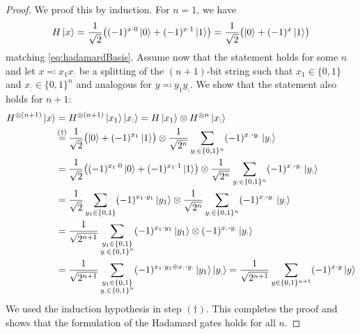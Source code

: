 				\begin{proof}
					We proof this by induction. For \(n = 1\), we have
					\begin{equation}
						H \ket{x}
						= \frac{1}{\sqrt{2}} \bigl( (-1)^{x \cdot 0} \ket{0} + (-1)^{x \cdot 1} \ket{1} \bigr)
						= \frac{1}{\sqrt{2}} \bigl( \ket{0} + (-1)^x \ket{1} \bigr)
					\end{equation}
					matching \eqref{eq:hadamardBasis}. Assume now that the statement holds for some \(n\) and let \( x \eqqcolon x_1 x_: \) be a splitting of the \((n + 1)\)-bit string such that \( x_1 \in \{ 0, 1 \} \) and \( x_: \in \{ 0, 1 \}^n \) and analogous for \( y \eqqcolon y_1 y_: \). We show that the statement also holds for \(n + 1\):
					\begin{align}
						H^{\otimes (n + 1)} \ket{x}
						 & = H^{\otimes (n + 1)} \ket{x_1}\ket{x_:}
						= H \ket{x_1} \otimes H^{\otimes n} \ket{x_:}                                                                                                                                                    \\
						 & \overset{\mathclap{(\dagger)}}{=} \frac{1}{\sqrt{2}} \bigl( \ket{0} + (-1)^{x_1} \ket{1} \bigr) \otimes \frac{1}{\sqrt{2^n}} \sum_{y_: \in \{ 0, 1 \}^n} (-1)^{x_: \dotproduct y_:} \ket{y_:} \\
						 & = \frac{1}{\sqrt{2}} \bigl( (-1)^{x_1 \cdot 0} \ket{0} + (-1)^{x_1 \cdot 1} \ket{1} \bigr) \otimes \frac{1}{\sqrt{2^n}} \sum_{y_: \in \{ 0, 1 \}^n} (-1)^{x_: \dotproduct y_:} \ket{y_:}      \\
						 & = \frac{1}{\sqrt{2}} \sum_{y_1 \in \{ 0, 1 \}} (-1)^{x_1 \cdot y_1} \ket{y_1} \otimes \frac{1}{\sqrt{2^n}} \sum_{y_: \in \{ 0, 1 \}^n} (-1)^{x_: \dotproduct y_:} \ket{y_:}                   \\
						 & = \frac{1}{\sqrt{2^{n + 1}}} \sum_{\substack{y_1 \in \{ 0, 1 \}                                                                                                                               \\ y_: \in \{ 0, 1 \}^n}} (-1)^{x_1 \cdot y_1} \ket{y_1} \otimes (-1)^{x_: \dotproduct y_:} \ket{y_:} \\
						 & = \frac{1}{\sqrt{2^{n + 1}}} \sum_{\substack{y_1 \in \{ 0, 1 \}                                                                                                                               \\ y_: \in \{ 0, 1 \}^n}} (-1)^{x_1 \cdot y_1 \oplus x_: \dotproduct y_:} \ket{y_1}\ket{y_:}
						= \frac{1}{\sqrt{2^{n + 1}}} \sum_{y \in \{ 0, 1 \}^{n + 1}} (-1)^{x \cdot y} \ket{y}
					\end{align}
					We used the induction hypothesis in step \((\dagger)\). This completes the proof and shows that the formulation of the Hadamard gates holds for all \(n\).
				\end{proof}

